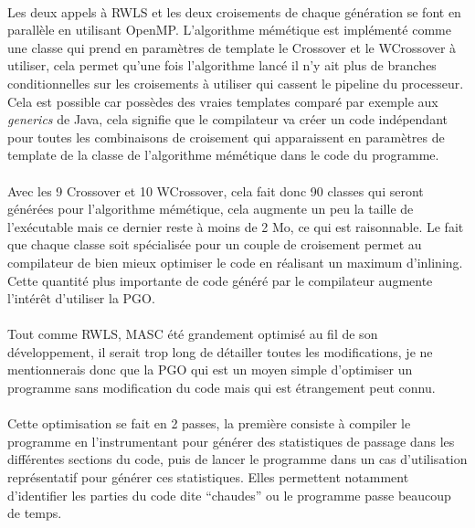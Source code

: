 \documentclass[a4paper,11pt,twoside,french,report]{../common/simplem}
\begin{document}
				\paragraph*{}
					Les deux appels à \gls{RWLS} et les deux croisements de chaque génération se font en parallèle en utilisant \gls{OpenMP}. L'algorithme mémétique est implémenté comme une classe qui prend en paramètres de template le Crossover et le WCrossover à utiliser, cela permet qu'une fois l'algorithme lancé il n'y ait plus de branches conditionnelles sur les croisements à utiliser qui cassent le pipeline du processeur. Cela est possible car \Cpp{} possèdes des vraies templates comparé par exemple aux \textit{generics} de Java, cela signifie que le compilateur va créer un code indépendant pour toutes les combinaisons de croisement qui apparaissent en paramètres de template de la classe de l'algorithme mémétique dans le code du programme.
				\paragraph*{}
					Avec les 9 Crossover et 10 WCrossover, cela fait donc 90 classes qui seront générées pour l'algorithme mémétique, cela augmente un peu la taille de l'exécutable mais ce dernier reste à moins de 2 Mo, ce qui est raisonnable. Le fait que chaque classe soit spécialisée pour un couple de croisement permet au compilateur de bien mieux optimiser le code en réalisant un maximum d'inlining. Cette quantité plus importante de code généré par le compilateur augmente l'intérêt d'utiliser la \gls{PGO}.
				\paragraph*{}
					Tout comme \gls{RWLS}, \gls{MASC} été grandement optimisé au fil de son développement, il serait trop long de détailler toutes les modifications, je ne mentionnerais donc que la \gls{PGO} qui est un moyen simple d'optimiser un programme sans modification du code mais qui est étrangement peut connu.
				\paragraph*{}
					Cette optimisation se fait en 2 passes, la première consiste à compiler le programme en l'instrumentant pour générer des statistiques de passage dans les différentes sections du code, puis de lancer le programme dans un cas d'utilisation représentatif pour générer ces statistiques. Elles permettent notamment d'identifier les parties du code dite ``chaudes'' ou le programme passe beaucoup de temps.
\end{document}
